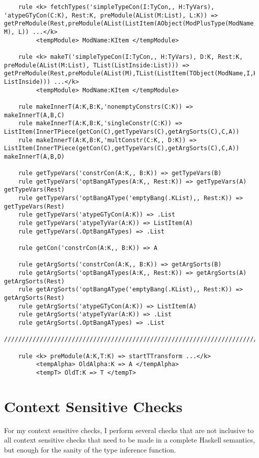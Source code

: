 \begin{lstlisting}
    rule <k> fetchTypes('simpleTypeCon(I:TyCon,, H:TyVars), 'atypeGTyCon(C:K), Rest:K, preModule(AList(M:List), L:K)) => getPreModule(Rest,preModule(AList(ListItem(AObject(ModPlusType(ModName,I),C)) M), L)) ...</k>
         <tempModule> ModName:KItem </tempModule>

    rule <k> makeT('simpleTypeCon(I:TyCon,, H:TyVars), D:K, Rest:K, preModule(AList(M:List), TList(ListInside:List))) => getPreModule(Rest,preModule(AList(M),TList(ListItem(TObject(ModName,I,H,makeInnerT(I,H,D))) ListInside))) ...</k>
         <tempModule> ModName:KItem </tempModule>

    rule makeInnerT(A:K,B:K,'nonemptyConstrs(C:K)) => makeInnerT(A,B,C)
    rule makeInnerT(A:K,B:K,'singleConstr(C:K)) => ListItem(InnerTPiece(getCon(C),getTypeVars(C),getArgSorts(C),C,A))
    rule makeInnerT(A:K,B:K,'multConstr(C:K,, D:K)) => ListItem(InnerTPiece(getCon(C),getTypeVars(C),getArgSorts(C),C,A)) makeInnerT(A,B,D)

    rule getTypeVars('constrCon(A:K,, B:K)) => getTypeVars(B)
    rule getTypeVars('optBangATypes(A:K,, Rest:K)) => getTypeVars(A) getTypeVars(Rest)
    rule getTypeVars('optBangAType('emptyBang(.KList),, Rest:K)) => getTypeVars(Rest)
    rule getTypeVars('atypeGTyCon(A:K)) => .List
    rule getTypeVars('atypeTyVar(A:K)) => ListItem(A)
    rule getTypeVars(.OptBangATypes) => .List

    rule getCon('constrCon(A:K,, B:K)) => A

    rule getArgSorts('constrCon(A:K,, B:K)) => getArgSorts(B)
    rule getArgSorts('optBangATypes(A:K,, Rest:K)) => getArgSorts(A) getArgSorts(Rest)
    rule getArgSorts('optBangAType('emptyBang(.KList),, Rest:K)) => getArgSorts(Rest)
    rule getArgSorts('atypeGTyCon(A:K)) => ListItem(A)
    rule getArgSorts('atypeTyVar(A:K)) => .List
    rule getArgSorts(.OptBangATypes) => .List

////////////////////////////////////////////////////////////////////////////////////////////////////////////////////////

    rule <k> preModule(A:K,T:K) => startTTransform ...</k>
         <tempAlpha> OldAlpha:K => A </tempAlpha>
         <tempT> OldT:K => T </tempT>
\end{lstlisting}

\section{Context Sensitive Checks}
For my context sensitive checks, I perform several checks that are not inclusive to all context sensitive checks that need to be made in a complete Haskell semantics, but enough for the sanity of the type inference function.

